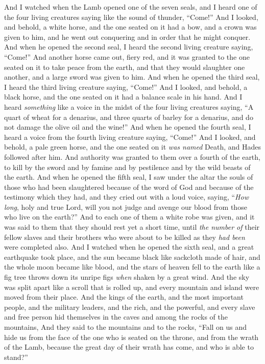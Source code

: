 \begin{biblechapter} %
 And I watched when the Lamb opened one of the seven seals, and I heard one of the four living creatures saying like the sound of thunder, “Come!”
\verse And I looked, and behold, a white horse, and the one seated on it had a bow, and a crown was given to him, and he went out conquering and in order that he might conquer.
\verse And when he opened the second seal, I heard the second living creature saying, “Come!”
\verse And another horse came out, fiery red, and it was granted to the one seated on it to take peace from the earth, and that they would slaughter one another, and a large sword was given to him.
\verse And when he opened the third seal, I heard the third living creature saying, “Come!” And I looked, and behold, a black horse, and the one seated on it had a balance scale in his hand.
\verse And I heard \textit{something} like a voice in the midst of the four living creatures saying, “A quart of wheat for a denarius, and three quarts of barley for a denarius, and do not damage the olive oil and the wine!”
\verse And when he opened the fourth seal, I heard a voice from the fourth living creature saying, “Come!”
\verse And I looked, and behold, a pale green horse, and the one seated on it \textit{was named} Death, and Hades followed after him. And authority was granted to them over a fourth of the earth, to kill by the sword and by famine and by pestilence and by the wild beasts of the earth.
\verse And when he opened the fifth seal, I saw under the altar the souls of those who had been slaughtered because of the word of God and because of the testimony which they had,
\verse and they cried out with a loud voice, saying, “\textit{How long}, holy and true Lord, will you not judge and avenge our blood from those who live on the earth?”
\verse And to each one of them a white robe was given, and it was said to them that they should rest yet a short time, until \textit{the number of} their fellow slaves and their brothers who were about to be killed as they \textit{had been} were completed also.
\verse And I watched when he opened the sixth seal, and a great earthquake took place, and the sun became black like sackcloth made of hair, and the whole moon became like blood,
\verse and the stars of heaven fell to the earth like a fig tree throws down its unripe figs \textit{when} shaken by a great wind.
\verse And the sky was split apart like a scroll that is rolled up, and every mountain and island were moved from their place.
\verse And the kings of the earth, and the most important people, and the military leaders, and the rich, and the powerful, and every slave and free person hid themselves in the caves and among the rocks of the mountains,
\verse And they said to the mountains and to the rocks, “Fall on us and hide us from the face of the one who is seated on the throne, and from the wrath of the Lamb,
\verse because the great day of their wrath has come, and who is able to stand?”
\end{biblechapter}

